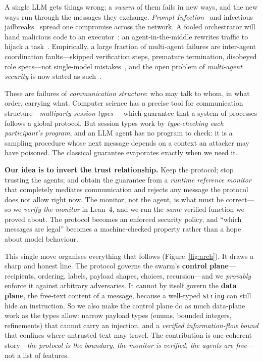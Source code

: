 \documentclass[10pt,twocolumn]{article}
\newcommand{\code}[1]{\texttt{\small #1}}
\begin{document}
A single LLM gets things wrong; a \emph{swarm} of them fails in new ways, and the new ways run through the
messages they exchange. \emph{Prompt Infection}~\cite{lee2024promptinfection} and infectious
jailbreaks~\cite{gu2024agentsmith} spread one compromise across the network. A fooled orchestrator will
hand malicious code to an executor~\cite{triedman2025mas}; an agent-in-the-middle rewrites traffic to
hijack a task~\cite{he2025aitm}. Empirically, a large fraction of multi-agent failures are
inter-agent coordination faults---skipped verification steps, premature termination, disobeyed role
specs---not single-model mistakes~\cite{cemri2025mast}, and the open problem of \emph{multi-agent
security} is now stated as such~\cite{schroederdewitt2025open,hammond2025multiagent}.

These are failures of \emph{communication structure}: who may talk to whom, in what order, carrying what.
Computer science has a precise tool for communication structure---\emph{multiparty session
types}~\cite{honda2008mpst,honda2016mpst}---which guarantee that a system of processes follows a global
protocol. But session types work by \emph{type-checking each participant's program}, and an LLM agent has
no program to check: it is a sampling procedure whose next message depends on a context an attacker may
have poisoned. The classical guarantee evaporates exactly when we need it.

\textbf{Our idea is to invert the trust relationship.} Keep the protocol; stop trusting the agents; and
obtain the guarantee from a \emph{runtime reference monitor}~\cite{schneider2000enforceable} that
completely mediates communication and rejects any message the protocol does not allow right now. The
monitor, not the agent, is what must be correct---so we \emph{verify the monitor} in Lean~4, and we run the
\emph{same} verified function we proved about. The protocol becomes an enforced security policy, and
``which messages are legal'' becomes a machine-checked property rather than a hope about model behaviour.

This single move organises everything that follows (Figure~\ref{fig:arch}). It draws a sharp and honest
line. The protocol governs the swarm's \textbf{control plane}---recipients, ordering, labels, payload
shapes, choices, recursion---and we \emph{provably} enforce it against arbitrary adversaries. It cannot by
itself govern the \textbf{data plane}, the free-text content of a message, because a well-typed
\code{string} can still hide an instruction. So we also make the control plane do as much data-plane work
as the types allow: narrow payload types (enums, bounded integers, refinements) that cannot carry an
injection, and a \emph{verified information-flow bound} that confines where untrusted text may travel. The
contribution is one coherent story---\emph{the protocol is the boundary, the monitor is verified, the
agents are free}---not a list of features.
\end{document}
